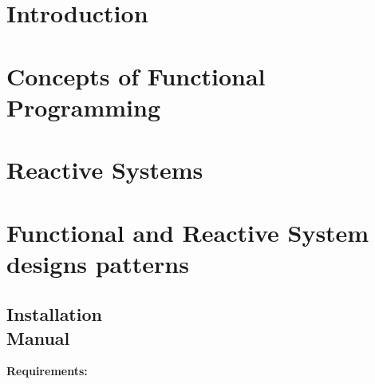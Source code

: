 \documentclass[12pt, a4paper, twoside]{article}
\begin{document}


\newpage



\tableofcontents

\section{Introduction}


\section{Concepts of Functional Programming}


\section{Reactive Systems}


\section{Functional and Reactive System designs patterns}


\printbibliography

\newpage

\begin{umaappendices}
\section{Installation \\ Manual}
    
    \textbf{\large{Requirements:}}
    
    \blindtext

\end{umaappendices}
\end{document}
